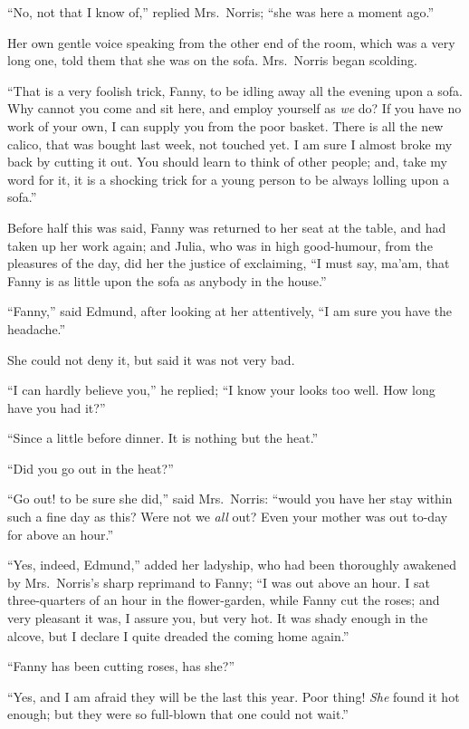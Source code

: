 \documentclass{article}
\begin{document}
``No, not that I know of,'' replied Mrs.\ Norris; ``she was
here a moment ago.''

Her own gentle voice speaking from the other end
of the room, which was a very long one, told them
that she was on the sofa.  Mrs.\ Norris began scolding.

``That is a very foolish trick, Fanny, to be idling away all
the evening upon a sofa.  Why cannot you come and sit here,
and employ yourself as \emph{we} do?  If you have no work
of your own, I can supply you from the poor basket.
There is all the new calico, that was bought last week,
not touched yet.  I am sure I almost broke my back
by cutting it out.  You should learn to think of
other people; and, take my word for it, it is a shocking
trick for a young person to be always lolling upon a sofa.''

Before half this was said, Fanny was returned to her
seat at the table, and had taken up her work again;
and Julia, who was in high good-humour, from the pleasures
of the day, did her the justice of exclaiming, ``I must say,
ma'am, that Fanny is as little upon the sofa as anybody
in the house.''

``Fanny,'' said Edmund, after looking at her attentively,
``I am sure you have the headache.''

She could not deny it, but said it was not very bad.

``I can hardly believe you,'' he replied; ``I know your looks
too well.  How long have you had it?''

``Since a little before dinner.  It is nothing but the heat.''

``Did you go out in the heat?''

``Go out! to be sure she did,'' said Mrs.\ Norris:
``would you have her stay within such a fine day as this?
Were not we \emph{all} out?  Even your mother was out to-day
for above an hour.''

``Yes, indeed, Edmund,'' added her ladyship, who had been
thoroughly awakened by Mrs.\ Norris's sharp reprimand
to Fanny; ``I was out above an hour.  I sat three-quarters
of an hour in the flower-garden, while Fanny cut the roses;
and very pleasant it was, I assure you, but very hot.
It was shady enough in the alcove, but I declare I quite
dreaded the coming home again.''

``Fanny has been cutting roses, has she?''

``Yes, and I am afraid they will be the last this year.
Poor thing!  \emph{She} found it hot enough; but they were so
full-blown that one could not wait.''
\end{document}
